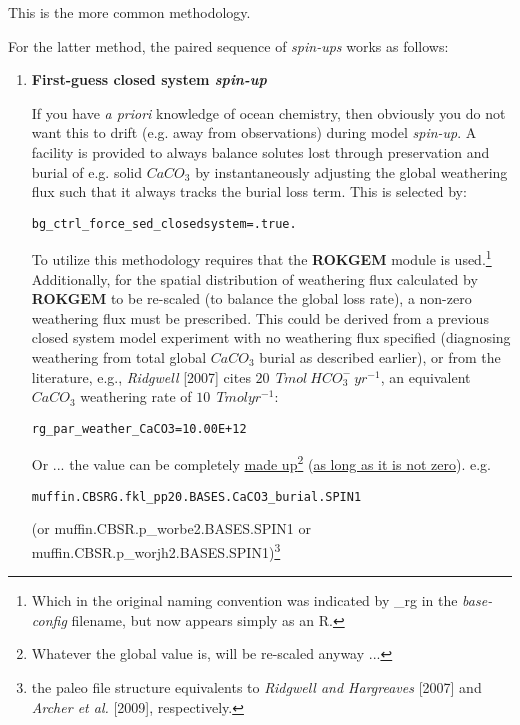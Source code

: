 \begin{enumerate}[noitemsep]
This is the more common methodology.

\vspace{1mm}
For the latter method, the paired sequence of \textit{spin-ups} works as follows:

\begin{enumerate}

\vspace{2mm}
\item \textbf{First-guess closed system \textit{spin-up}}

\vspace{1mm}
If you have \textit{a priori} knowledge of ocean chemistry, then obviously you do not want this to drift (e.g. away from observations) during model \textit{spin-up}. A facility is provided to always balance solutes lost through preservation and burial of e.g. solid \(CaCO_{3}\) by instantaneously adjusting the global weathering flux such that it always tracks the burial loss term. This is selected by:
\vspace{-1mm}\small\begin{verbatim}
bg_ctrl_force_sed_closedsystem=.true.
\end{verbatim}\normalsize\vspace{-1mm}

To utilize this methodology requires that the \textbf{ROKGEM} module is used.\footnote{Which in the original naming convention was indicated by \textsf{\footnotesize \_rg} in the \textit{base-config} filename, but now appears simply as an \textsf{\footnotesize R}.} Additionally, for the spatial distribution of weathering flux calculated by \textbf{ROKGEM} to be re-scaled (to balance the global loss rate), a non-zero weathering flux must be prescribed. This could be derived from a previous closed system model experiment with no weathering flux specified (diagnosing weathering from total global \(CaCO_{3}\) burial as described earlier), or from the literature, e.g., \textit{Ridgwell} [2007] cites \(20\:\ Tmol \:HCO^{-}_{3} \:yr^{-1}\), an equivalent \(CaCO_{3}\) weathering rate of \(10\:\ Tmol yr^{-1}\):
\vspace{1mm}
\vspace{-1mm}\small\begin{verbatim}
rg_par_weather_CaCO3=10.00E+12
\end{verbatim}\normalsize\vspace{-1mm}

Or ... the value can be completely \uline{made up}\footnote{Whatever the global value is, will be re-scaled anyway ...} (\uline{as long as it is not zero}). e.g.
\vspace{1mm}
\vspace{-1mm}\small\begin{verbatim}
muffin.CBSRG.fkl_pp20.BASES.CaCO3_burial.SPIN1
\end{verbatim}\normalsize\vspace{-1mm}
(or \textsf{\footnotesize muffin.CBSR.p\_worbe2.BASES.SPIN1} or \textsf{\footnotesize muffin.CBSR.p\_worjh2.BASES.SPIN1})\footnote{the paleo file structure equivalents to \textit{Ridgwell and Hargreaves} [2007] and \textit{Archer et al.} [2009], respectively.}


\end{enumerate}
\end{enumerate}
